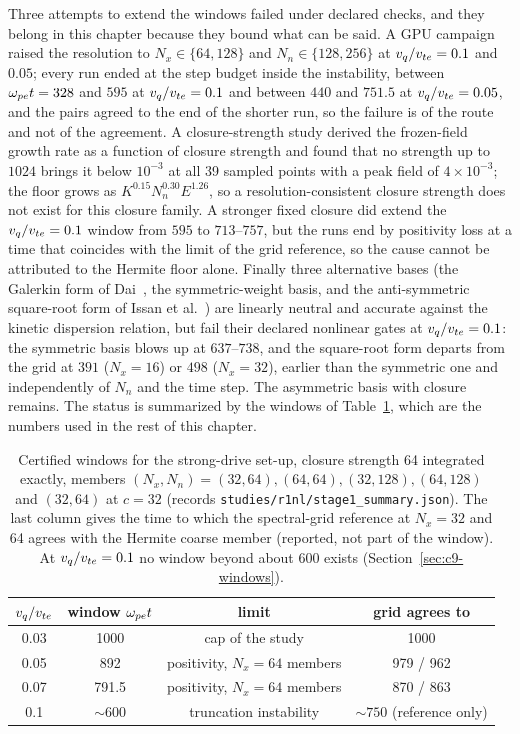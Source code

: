 Three attempts to extend the windows failed under declared checks, and they belong in this chapter because they bound what can be said. A GPU campaign raised the resolution to $N_x\in\{64,128\}$ and $N_n\in\{128,256\}$ at $v_q/v_{te}=0.1$ and $0.05$; every run ended at the step budget inside the instability, between $\omega_{pe} t=328$ and $595$ at $v_q/v_{te}=0.1$ and between $440$ and $751.5$ at $v_q/v_{te}=0.05$, and the pairs agreed to the end of the shorter run, so the failure is of the route and not of the agreement. A closure-strength study derived the frozen-field growth rate as a function of closure strength and found that no strength up to $1024$ brings it below $10^{-3}$ at all 39 sampled points with a peak field of $4\times10^{-3}$; the floor grows as $K^{0.15}N_n^{0.30}E^{1.26}$, so a resolution-consistent closure strength does not exist for this closure family. A stronger fixed closure did extend the $v_q/v_{te}=0.1$ window from $595$ to $713$--$757$, but the runs end by positivity loss at a time that coincides with the limit of the grid reference, so the cause cannot be attributed to the Hermite floor alone. Finally three alternative bases (the Galerkin form of Dai~\cite{Dai2026}, the symmetric-weight basis, and the anti-symmetric square-root form of Issan et al.~\cite{Issan2024a,Issan2025}) are linearly neutral and accurate against the kinetic dispersion relation, but fail their declared nonlinear gates at $v_q/v_{te}=0.1$: the symmetric basis blows up at $637$--$738$, and the square-root form departs from the grid at $391$ ($N_x=16$) or $498$ ($N_x=32$), earlier than the symmetric one and independently of $N_n$ and the time step. The asymmetric basis with closure remains. The status is summarized by the windows of Table~\ref{tab:c9-win}, which are the numbers used in the rest of this chapter.

\begin{table}[t]
\centering
\caption{Certified windows for the strong-drive set-up, closure strength 64 integrated exactly, members $(N_x,N_n)=(32,64),(64,64),(32,128),(64,128)$ and $(32,64)$ at $c=32$ (records \texttt{studies/r1nl/stage1\_summary.json}). The last column gives the time to which the spectral-grid reference at $N_x=32$ and 64 agrees with the Hermite coarse member (reported, not part of the window). At $v_q/v_{te}=0.1$ no window beyond about 600 exists (Section~\ref{sec:c9-windows}).}\label{tab:c9-win}
\small
\begin{tabular}{@{}cccc@{}}\toprule
$v_q/v_{te}$ & window $\omega_{pe} t$ & limit & grid agrees to\\\midrule
0.03 & 1000 & cap of the study & 1000\\
0.05 & 892 & positivity, $N_x=64$ members & 979 / 962\\
0.07 & 791.5 & positivity, $N_x=64$ members & 870 / 863\\
0.1 & $\sim600$ & truncation instability & $\sim750$ (reference only)\\\bottomrule
\end{tabular}
\end{table}

